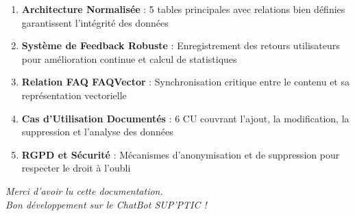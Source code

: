 \documentclass[11pt,a4paper]{article}
\begin{document}
\begin{important}
\begin{enumerate}
    \item \textbf{Architecture Normalisée} : 5 tables principales avec relations bien définies garantissent l'intégrité des données
    
    \item \textbf{Système de Feedback Robuste} : Enregistrement des retours utilisateurs pour amélioration continue et calcul de statistiques
    
    \item \textbf{Relation FAQ  FAQVector} : Synchronisation critique entre le contenu et sa représentation vectorielle
    
    \item \textbf{Cas d'Utilisation Documentés} : 6 CU couvrant l'ajout, la modification, la suppression et l'analyse des données
    
    \item \textbf{RGPD et Sécurité} : Mécanismes d'anonymisation et de suppression pour respecter le droit à l'oubli
\end{enumerate}
\end{important}


\vfill

\begin{center}
\textit{Merci d'avoir lu cette documentation. \\
Bon développement sur le ChatBot SUP'PTIC !}
\end{center}
\end{document}
